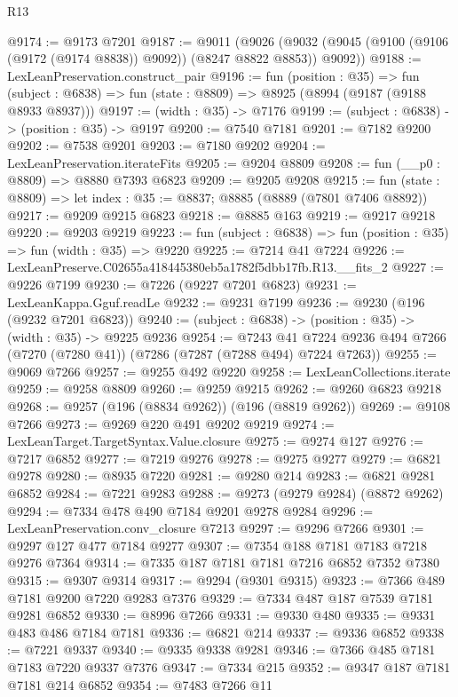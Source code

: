 \begin{lexlean}{R13}
\begin{coremodule}
@9174 := @9173 @7201
@9187 := @9011
    (@9026 (@9032 (@9045 (@9100 (@9106 (@9172 (@9174 @8838)) @9092)) (@8247 @8822 @8853)) @9092))
@9188 := LexLeanPreservation.construct_pair
@9196 := fun (position : @35) =>
  fun (subject : @6838) => fun (state : @8809) => @8925 (@8994 (@9187 (@9188 @8933 @8937)))
@9197 := (width : @35) -> @7176
@9199 := (subject : @6838) -> (position : @35) -> @9197
@9200 := @7540 @7181
@9201 := @7182 @9200
@9202 := @7538 @9201
@9203 := @7180 @9202
@9204 := LexLeanPreservation.iterateFits
@9205 := @9204 @8809
@9208 := fun (__p0 : @8809) => @8880 @7393 @6823
@9209 := @9205 @9208
@9215 := fun (state : @8809) => let index : @35 := @8837; @8885 (@8889 (@7801 @7406 @8892))
@9217 := @9209 @9215 @6823
@9218 := @8885 @163
@9219 := @9217 @9218
@9220 := @9203 @9219
@9223 := fun (subject : @6838) => fun (position : @35) => fun (width : @35) => @9220
@9225 := @7214 @41 @7224
@9226 := LexLeanPreserve.C02655a418445380eb5a1782f5dbb17fb.R13.__fits_2
@9227 := @9226 @7199
@9230 := @7226 (@9227 @7201 @6823)
@9231 := LexLeanKappa.Gguf.readLe
@9232 := @9231 @7199
@9236 := @9230 (@196 (@9232 @7201 @6823))
@9240 := (subject : @6838) -> (position : @35) -> (width : @35) -> @9225 @9236
@9254 := @7243
    @41
    @7224
    @9236
    @494
    @7266
    (@7270 (@7280 @41))
    (@7286 (@7287 (@7288 @494) @7224 @7263))
@9255 := @9069 @7266
@9257 := @9255 @492 @9220
@9258 := LexLeanCollections.iterate
@9259 := @9258 @8809
@9260 := @9259 @9215
@9262 := @9260 @6823 @9218
@9268 := @9257 (@196 (@8834 @9262)) (@196 (@8819 @9262))
@9269 := @9108 @7266
@9273 := @9269 @220 @491 @9202 @9219
@9274 := LexLeanTarget.TargetSyntax.Value.closure
@9275 := @9274 @127
@9276 := @7217 @6852
@9277 := @7219 @9276
@9278 := @9275 @9277
@9279 := @6821 @9278
@9280 := @8935 @7220
@9281 := @9280 @214
@9283 := @6821 @9281 @6852
@9284 := @7221 @9283
@9288 := @9273 (@9279 @9284) (@8872 @9262)
@9294 := @7334 @478 @490 @7184 @9201 @9278 @9284
@9296 := LexLeanPreservation.conv_closure @7213
@9297 := @9296 @7266
@9301 := @9297 @127 @477 @7184 @9277
@9307 := @7354 @188 @7181 @7183 @7218 @9276 @7364
@9314 := @7335 @187 @7181 @7181 @7216 @6852 @7352 @7380
@9315 := @9307 @9314
@9317 := @9294 (@9301 @9315)
@9323 := @7366 @489 @7181 @9200 @7220 @9283 @7376
@9329 := @7334 @487 @187 @7539 @7181 @9281 @6852
@9330 := @8996 @7266
@9331 := @9330 @480
@9335 := @9331 @483 @486 @7184 @7181
@9336 := @6821 @214
@9337 := @9336 @6852
@9338 := @7221 @9337
@9340 := @9335 @9338 @9281
@9346 := @7366 @485 @7181 @7183 @7220 @9337 @7376
@9347 := @7334 @215
@9352 := @9347 @187 @7181 @7181 @214 @6852
@9354 := @7483 @7266 @11

\end{coremodule}
\end{lexlean}
